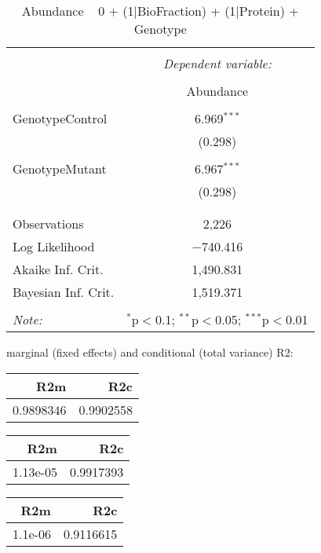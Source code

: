 \documentclass[11pt]{report}
\begin{document}
\begin{table}[!htbp] \centering 
  \caption{Abundance ~ 0 + (1|BioFraction) + (1|Protein) + Genotype} 
  \label{} 
\begin{tabular}{@{\extracolsep{5pt}}lc} 
\\[-1.8ex]\hline 
\hline \\[-1.8ex] 
 & \multicolumn{1}{c}{\textit{Dependent variable:}} \\ 
\cline{2-2} 
\\[-1.8ex] & Abundance \\ 
\hline \\[-1.8ex] 
 GenotypeControl & 6.969$^{***}$ \\ 
  & (0.298) \\ 
  & \\ 
 GenotypeMutant & 6.967$^{***}$ \\ 
  & (0.298) \\ 
  & \\ 
\hline \\[-1.8ex] 
Observations & 2,226 \\ 
Log Likelihood & $-$740.416 \\ 
Akaike Inf. Crit. & 1,490.831 \\ 
Bayesian Inf. Crit. & 1,519.371 \\ 
\hline 
\hline \\[-1.8ex] 
\textit{Note:}  & \multicolumn{1}{r}{$^{*}$p$<$0.1; $^{**}$p$<$0.05; $^{***}$p$<$0.01} \\ 
\end{tabular} 
\end{table} 
marginal (fixed effects) and conditional (total variance) R2:

\begin{tabular}{r|r}
\hline
R2m & R2c\\
\hline
0.9898346 & 0.9902558\\
\hline
\end{tabular}

\begin{tabular}{r|r}
\hline
R2m & R2c\\
\hline
1.13e-05 & 0.9917393\\
\hline
\end{tabular}

\begin{tabular}{r|r}
\hline
R2m & R2c\\
\hline
1.1e-06 & 0.9116615\\
\hline
\end{tabular}
\end{document}
